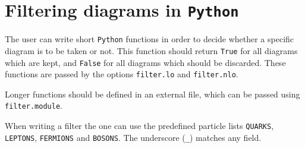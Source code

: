 \documentclass[11pt,a4paper]{refrep}
\newcommand{\python}{{\tt Python}\xspace}
\begin{document}

\section{Filtering diagrams in \python{}}
\label{sec:filter}
The user can write short \python{} functions in order to decide whether
a specific diagram is to be taken or not. This function should return
\texttt{True} for all diagrams which are kept, and \texttt{False} for
all diagrams which should be discarded. These functions are passed by
the options \texttt{filter.lo} and \texttt{filter.nlo}.

Longer functions should be defined in an external file, which can be
passed using \texttt{filter.module}.

When writing a filter the one can use the predefined particle lists
\texttt{QUARKS}, \texttt{LEPTONS}, \texttt{FERMIONS} and \texttt{BOSONS}.
The underscore (\texttt{\_}) matches any field.
\end{document}
